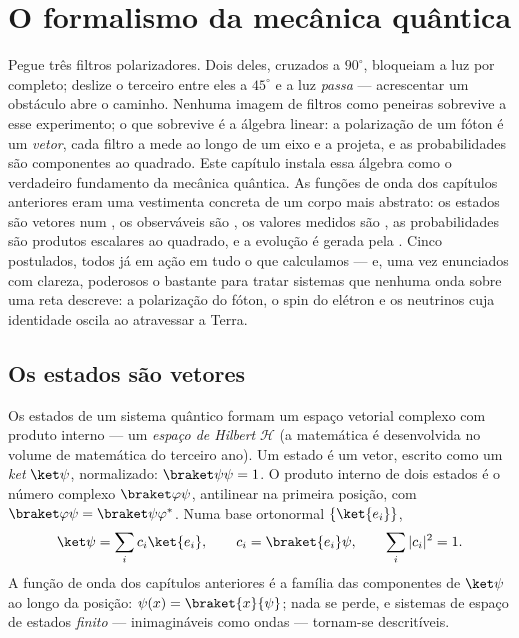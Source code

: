 \chapter{O formalismo da mecânica quântica}\label{ch:b3:quantum-formalism}

Pegue três filtros polarizadores. Dois deles, cruzados a $90^\circ$,
bloqueiam a luz por completo; deslize o terceiro entre eles a
$45^\circ$ e a luz \emph{passa} --- acrescentar um obstáculo abre o
caminho. Nenhuma imagem de filtros como peneiras sobrevive a esse
experimento; o que sobrevive é a álgebra linear: a polarização de um
fóton é um \emph{vetor}, cada filtro a mede ao longo de um eixo e a
projeta, e as probabilidades são componentes ao quadrado. Este capítulo
instala essa álgebra como o verdadeiro fundamento da mecânica quântica.
As funções de onda dos capítulos anteriores eram uma vestimenta
concreta de um corpo mais abstrato: os estados são vetores num , os observáveis são , os valores
medidos são , as probabilidades são produtos escalares ao
quadrado, e a evolução é gerada pela . Cinco postulados,
todos já em ação em tudo o que calculamos --- e, uma vez enunciados com
clareza, poderosos o bastante para tratar sistemas que nenhuma onda
sobre uma reta descreve: a polarização do fóton, o spin do elétron e os
neutrinos cuja identidade oscila ao atravessar a Terra.

\section{Os estados são vetores}

\begin{definition}\label{def:b3:quantum-formalism:state}
Os estados de um sistema quântico formam um espaço vetorial complexo
com produto interno --- um \emph{espaço de Hilbert} $\mathcal H$ (a
matemática é desenvolvida no volume de matemática do terceiro ano). Um
estado é um vetor, escrito como um \emph{ket} $\ket\psi$, normalizado:
$\braket\psi\psi = 1$. O produto interno de dois estados é o número
complexo $\braket\varphi\psi$, antilinear na primeira posição, com
$\braket\varphi\psi = \braket\psi\varphi^*$. Numa base ortonormal
$\{\ket{e_i}\}$,
\[
\ket\psi = \sum_i c_i\ket{e_i} , \qquad
c_i = \braket{e_i}\psi , \qquad
\sum_i|c_i|^2 = 1 .
\]
A função de onda dos capítulos anteriores é a família das componentes
de $\ket\psi$ ao longo da posição: $\psi(x) =
\braket{x}{\psi}$; nada se perde, e sistemas de espaço de estados
\emph{finito} --- inimagináveis como ondas --- tornam-se descritíveis.
\end{definition}

